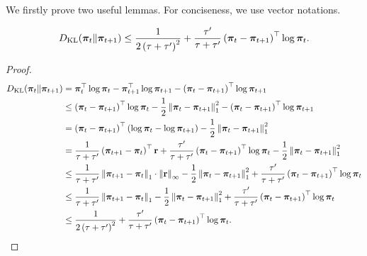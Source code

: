 We firstly prove two useful lemmas. For conciseness, we use vector notations.

\begin{lem}
\label{lem:kl_t_tp1_bound}
\begin{equation*}
\begin{split}
    D_{\mathrm{KL}}{\left( {\boldsymbol{\pi}}_t \middle\| {\boldsymbol{\pi}}_{t+1} \right)} \le \frac{1}{2\left(\tau + \tau^\prime\right)^2} + \frac{\tau^\prime}{\tau + \tau^\prime} \left( {\boldsymbol{\pi}}_t - {\boldsymbol{\pi}}_{t+1} \right)^\top \log{{\boldsymbol{\pi}}_t}.
\end{split}
\end{equation*}
\end{lem}
\begin{proof}
\begin{equation*}
\begin{split}
    D_{\mathrm{KL}}{\left( {\boldsymbol{\pi}}_t \middle\| {\boldsymbol{\pi}}_{t+1} \right)} &= {\boldsymbol{\pi}}_t^\top \log{{\boldsymbol{\pi}}_t} - {\boldsymbol{\pi}}_{t+1}^\top \log{{\boldsymbol{\pi}}_{t+1}} - \left( {\boldsymbol{\pi}}_t - {\boldsymbol{\pi}}_{t+1} \right)^\top \log{{\boldsymbol{\pi}}_{t+1}} \\
    &\le \left( {\boldsymbol{\pi}}_t - {\boldsymbol{\pi}}_{t+1} \right)^\top \log{{\boldsymbol{\pi}}_t} - \frac{1}{2} \left\| {\boldsymbol{\pi}}_t - {\boldsymbol{\pi}}_{t+1} \right\|_1^2 - \left( {\boldsymbol{\pi}}_t - {\boldsymbol{\pi}}_{t+1} \right)^\top \log{{\boldsymbol{\pi}}_{t+1}} \\
    &= \left( {\boldsymbol{\pi}}_t - {\boldsymbol{\pi}}_{t+1} \right)^\top \left( \log{{\boldsymbol{\pi}}_t} - \log{{\boldsymbol{\pi}}_{t+1}} \right) - \frac{1}{2} \left\| {\boldsymbol{\pi}}_t - {\boldsymbol{\pi}}_{t+1} \right\|_1^2 \\
    &= \frac{1}{\tau + \tau^\prime} \left( {\boldsymbol{\pi}}_{t+1} - {\boldsymbol{\pi}}_t \right)^\top {\mathbf{r}} + \frac{\tau^\prime}{\tau + \tau^\prime} \left( {\boldsymbol{\pi}}_t - {\boldsymbol{\pi}}_{t+1} \right)^\top \log{{\boldsymbol{\pi}}_t} - \frac{1}{2} \left\| {\boldsymbol{\pi}}_t - {\boldsymbol{\pi}}_{t+1} \right\|_1^2 \\
    &\le \frac{1}{\tau + \tau^\prime} \left\| {\boldsymbol{\pi}}_{t+1} - {\boldsymbol{\pi}}_t \right\|_1 \cdot \left\| {\mathbf{r}} \right\|_\infty - \frac{1}{2} \left\| {\boldsymbol{\pi}}_t - {\boldsymbol{\pi}}_{t+1} \right\|_1^2 + \frac{\tau^\prime}{\tau + \tau^\prime} \left( {\boldsymbol{\pi}}_t - {\boldsymbol{\pi}}_{t+1} \right)^\top \log{{\boldsymbol{\pi}}_t} \\
    &\le \frac{1}{\tau + \tau^\prime} \left\| {\boldsymbol{\pi}}_{t+1} - {\boldsymbol{\pi}}_t \right\|_1  - \frac{1}{2} \left\| {\boldsymbol{\pi}}_t - {\boldsymbol{\pi}}_{t+1} \right\|_1^2 + \frac{\tau^\prime}{\tau + \tau^\prime} \left( {\boldsymbol{\pi}}_t - {\boldsymbol{\pi}}_{t+1} \right)^\top \log{{\boldsymbol{\pi}}_t} \\
    &\le \frac{1}{2\left(\tau + \tau^\prime\right)^2} + \frac{\tau^\prime}{\tau + \tau^\prime} \left( {\boldsymbol{\pi}}_t - {\boldsymbol{\pi}}_{t+1} \right)^\top \log{{\boldsymbol{\pi}}_t}. \qedhere
\end{split}
\end{equation*}
\end{proof}

